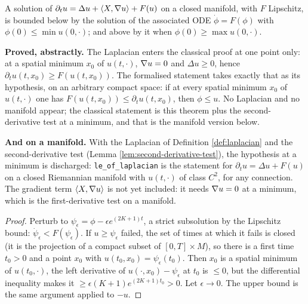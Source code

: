 \begin{theorem}
  \label{thm:max-scalar}
  \leanok
  A solution of $\partial_t u = \Delta u + \langle X, \nabla u\rangle + F(u)$ on
  a closed manifold, with $F$ Lipschitz, is bounded below by the solution of
  the associated ODE $\dot\phi = F(\phi)$ with $\phi(0) \le \min u(0,\cdot)$;
  and above by it when $\phi(0) \ge \max u(0,\cdot)$.

  \textbf{Proved, abstractly.} The Laplacian enters the classical proof at
  one point only: at a spatial minimum $x_0$ of $u(t,\cdot)$, $\nabla u = 0$ and
  $\Delta u \ge 0$, hence $\partial_t u(t,x_0) \ge F(u(t,x_0))$. The
  formalised statement takes exactly that as its hypothesis, on an arbitrary
  compact space: if at every spatial minimum $x_0$ of $u(t,\cdot)$ one has
  $F(u(t,x_0)) \le \partial_t u(t,x_0)$, then $\phi \le u$. No Laplacian and
  no manifold appear; the classical statement is this theorem plus the
  second-derivative test at a minimum, and that is the manifold version below.

  \textbf{And on a manifold.} With the Laplacian of Definition
  \ref{def:laplacian} and the second-derivative test
  (Lemma \ref{lem:second-derivative-test}), the hypothesis at a minimum is
  discharged: \texttt{le\_of\_laplacian} is the statement for
  $\partial_t u = \Delta u + F(u)$ on a closed Riemannian manifold with
  $u(t,\cdot)$ of class $C^2$, for any connection. The gradient term
  $\langle X, \nabla u\rangle$ is not yet included: it needs $\nabla u = 0$ at a
  minimum, which is the first-derivative test on a manifold.
\end{theorem}

\begin{proof}
  \leanok
  Perturb to $\psi_\epsilon = \phi - \epsilon e^{(2K+1)t}$, a strict
  subsolution by the Lipschitz bound: $\dot\psi_\epsilon < F(\psi_\epsilon)$.
  If $u \ge \psi_\epsilon$ failed, the set of times at which it fails is closed
  (it is the projection of a compact subset of $[0,T] \times M$), so there is a
  first time $t_0 > 0$ and a point $x_0$ with $u(t_0,x_0) = \psi_\epsilon(t_0)$.
  Then $x_0$ is a spatial minimum of $u(t_0,\cdot)$, the left derivative of
  $u(\cdot,x_0) - \psi_\epsilon$ at $t_0$ is $\le 0$, but the differential
  inequality makes it $\ge \epsilon (K+1) e^{(2K+1)t_0} > 0$. Let
  $\epsilon \to 0$. The upper bound is the same argument applied to $-u$.
\end{proof}

